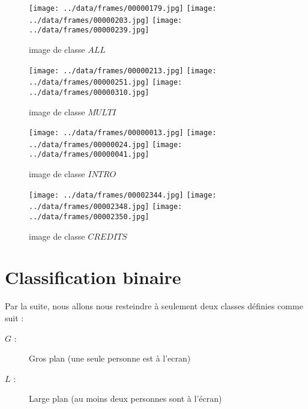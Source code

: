 \documentclass{book}
\begin{document}
\begin{figure}[H]
\begin{center}
\texttt{[image: ../data/frames/00000179.jpg]}
\texttt{[image: ../data/frames/00000203.jpg]}
\texttt{[image: ../data/frames/00000239.jpg]}
\end{center}
\caption{image de classe $ALL$}
\label{classeALL}
\end{figure}

\begin{figure}[H]
\begin{center}
\texttt{[image: ../data/frames/00000213.jpg]}
\texttt{[image: ../data/frames/00000251.jpg]}
\texttt{[image: ../data/frames/00000310.jpg]}
\end{center}
\caption{image de classe $MULTI$}
\label{classeMULTI}
\end{figure}

\begin{figure}[H]
\begin{center}
\texttt{[image: ../data/frames/00000013.jpg]}
\texttt{[image: ../data/frames/00000024.jpg]}
\texttt{[image: ../data/frames/00000041.jpg]}
\end{center}
\caption{image de classe $INTRO$}
\label{classeINTRO}
\end{figure}

\begin{figure}[H]
\begin{center}
\texttt{[image: ../data/frames/00002344.jpg]}
\texttt{[image: ../data/frames/00002348.jpg]}
\texttt{[image: ../data/frames/00002350.jpg]}
\end{center}
\caption{image de classe $CREDITS$}
\label{classeCREDITS}
\end{figure}

\section{Classification binaire}

Par la suite, nous allons nous resteindre à seulement deux classes définies comme suit :\\
\begin{description} %
\item[$G$ :] \og Gros plan \fg{} (une seule personne est à l'ecran)
\item[$L$ :] \og Large plan \fg{} (au moins deux personnes sont à l'écran)\\
\end{description}
\end{document}
